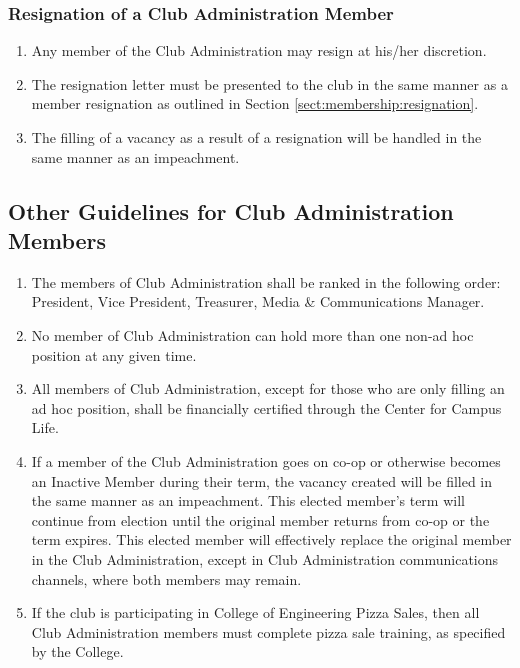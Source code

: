 \documentclass[english,11pt]{article}
\begin{document}
\subsubsection{Resignation of a Club Administration Member} \label{subsect:cadmin:removal:resignation}

\begin{enumerate}[label=\alph*.]
    \item Any member of the Club Administration may resign at his/her discretion.
    \item The resignation letter must be presented to the club in the same manner as a member resignation as outlined in Section \ref{sect:membership:resignation}.
    \item The filling of a vacancy as a result of a resignation will be handled in the same manner as an impeachment.
\end{enumerate}

\subsection{Other Guidelines for Club Administration Members} \label{subsect:cadmin:other}

\begin{enumerate}[label=\Alph*.]
    \item The members of Club Administration shall be ranked in the following order: President, Vice President, Treasurer, Media \& Communications Manager.
    \item No member of Club Administration can hold more than one non-ad hoc position at any given time.
    \item All members of Club Administration, except for those who are only filling an ad hoc position, shall be financially certified through the Center for Campus Life.
    \item If a member of the Club Administration goes on co-op or otherwise becomes an Inactive Member during their term, the vacancy created will be filled in the same manner as an impeachment.
          This elected member's term will continue from election until the original member returns from co-op or the term expires.
          This elected member will effectively replace the original member in the Club Administration, except in Club Administration communications channels, where both members may remain.
    \item If the club is participating in College of Engineering Pizza Sales, then all Club Administration members must complete pizza sale training, as specified by the College.
\end{enumerate}
\end{document}

